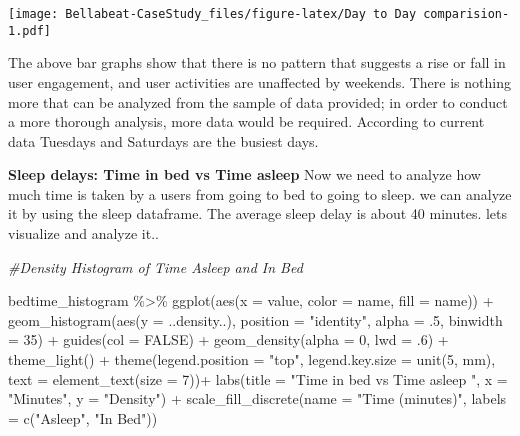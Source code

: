 \documentclass[
]{article}
\newenvironment{Shaded}{\begin{snugshade}}{\end{snugshade}}
\newcommand{\AttributeTok}[1]{\textcolor[rgb]{0.77,0.63,0.00}{#1}}
\newcommand{\CommentTok}[1]{\textcolor[rgb]{0.56,0.35,0.01}{\textit{#1}}}
\newcommand{\ConstantTok}[1]{\textcolor[rgb]{0.00,0.00,0.00}{#1}}
\newcommand{\DecValTok}[1]{\textcolor[rgb]{0.00,0.00,0.81}{#1}}
\newcommand{\FunctionTok}[1]{\textcolor[rgb]{0.00,0.00,0.00}{#1}}
\newcommand{\NormalTok}[1]{#1}
\newcommand{\SpecialCharTok}[1]{\textcolor[rgb]{0.00,0.00,0.00}{#1}}
\newcommand{\StringTok}[1]{\textcolor[rgb]{0.31,0.60,0.02}{#1}}
\begin{document}
\texttt{[image: Bellabeat-CaseStudy\_files/figure-latex/Day to Day comparision-1.pdf]}

The above bar graphs show that there is no pattern that suggests a rise
or fall in user engagement, and user activities are unaffected by
weekends. There is nothing more that can be analyzed from the sample of
data provided; in order to conduct a more thorough analysis, more data
would be required. According to current data Tuesdays and Saturdays are
the busiest days.

\textbf{Sleep delays: Time in bed vs Time asleep} Now we need to analyze
how much time is taken by a users from going to bed to going to sleep.
we can analyze it by using the sleep dataframe. The average sleep delay
is about 40 minutes. lets visualize and analyze it..

\begin{Shaded}
\begin{Highlighting}[]
\CommentTok{\#Density Histogram of Time Asleep and In Bed}

\NormalTok{ bedtime\_histogram }\SpecialCharTok{\%\textgreater{}\%}
   \FunctionTok{ggplot}\NormalTok{(}\FunctionTok{aes}\NormalTok{(}\AttributeTok{x =}\NormalTok{ value, }\AttributeTok{color =}\NormalTok{ name, }\AttributeTok{fill =}\NormalTok{ name)) }\SpecialCharTok{+}
   \FunctionTok{geom\_histogram}\NormalTok{(}\FunctionTok{aes}\NormalTok{(}\AttributeTok{y =}\NormalTok{ ..density..),  }\AttributeTok{position =} \StringTok{"identity"}\NormalTok{, }\AttributeTok{alpha =}\NormalTok{ .}\DecValTok{5}\NormalTok{, }\AttributeTok{binwidth =} \DecValTok{35}\NormalTok{) }\SpecialCharTok{+} 
   \FunctionTok{guides}\NormalTok{(}\AttributeTok{col =} \ConstantTok{FALSE}\NormalTok{) }\SpecialCharTok{+}
   \FunctionTok{geom\_density}\NormalTok{(}\AttributeTok{alpha =} \DecValTok{0}\NormalTok{, }\AttributeTok{lwd =}\NormalTok{ .}\DecValTok{6}\NormalTok{) }\SpecialCharTok{+}
   \FunctionTok{theme\_light}\NormalTok{() }\SpecialCharTok{+}
     \FunctionTok{theme}\NormalTok{(}\AttributeTok{legend.position =} \StringTok{"top"}\NormalTok{,}
         \AttributeTok{legend.key.size =} \FunctionTok{unit}\NormalTok{(}\DecValTok{5}\NormalTok{, }\StringTok{\textquotesingle{}mm\textquotesingle{}}\NormalTok{),}
         \AttributeTok{text =} \FunctionTok{element\_text}\NormalTok{(}\AttributeTok{size =} \DecValTok{7}\NormalTok{))}\SpecialCharTok{+}
   \FunctionTok{labs}\NormalTok{(}\AttributeTok{title =} \StringTok{"Time in bed vs Time asleep "}\NormalTok{, }
        \AttributeTok{x =} \StringTok{"Minutes"}\NormalTok{, }\AttributeTok{y =} \StringTok{"Density"}\NormalTok{) }\SpecialCharTok{+}
   \FunctionTok{scale\_fill\_discrete}\NormalTok{(}\AttributeTok{name =} \StringTok{"Time (minutes)"}\NormalTok{, }\AttributeTok{labels =} \FunctionTok{c}\NormalTok{(}\StringTok{"Asleep"}\NormalTok{, }\StringTok{"In Bed"}\NormalTok{))}
\end{Highlighting}
\end{Shaded}
\end{document}

